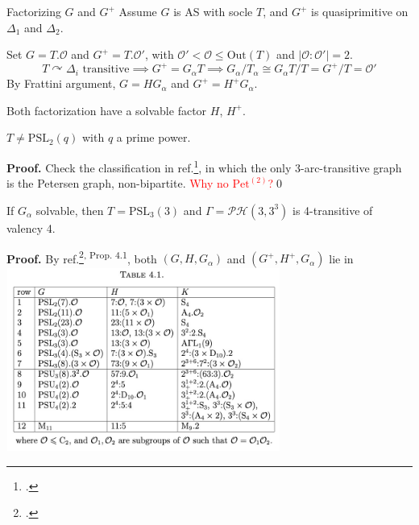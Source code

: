 \documentclass{beamer}
\def\PSL{\mathrm{PSL}}
\def\Out{\mathrm{Out}}
\def\PH{\mathcal{PH}}
\def\proof#1{\textbf{Proof.}{#1}\qed}
\begin{document}
\begin{frame}{Factorizing $G$ and $G^+$}
Assume $G$ is AS with socle $T$, and $G^+$ is quasiprimitive on $\Delta_1$ and $\Delta_2$.

Set $G=T.\mathcal{O}$ and $G^+=T.\mathcal{O}'$, with $\mathcal{O}'<\mathcal{O}\leq \Out(T)$ and $|\mathcal{O}:\mathcal{O}'|=2$.
\[ T\curvearrowright\Delta_i \text{ transitive} \implies G^+=G_\alpha T\implies G_\alpha/T_\alpha\cong G_\alpha T/ T=G^+/T=\mathcal{O'}\]
By Frattini argument, $G=HG_\alpha$ and $G^+=H^+G_\alpha$. 

Both factorization have a solvable factor $H$, $H^+$.

\begin{lemma}[5.1]
$T\neq \PSL_2(q)$ with $q$ a prime power.
\end{lemma}
\proof{ Check the classification in ref.\footcite{HASSANI1999twoarc}, in which the only 3-arc-transitive graph is the Petersen graph, non-bipartite. \qquad \textcolor{red}{Why no $\mathrm{Pet}^{(2)}$?}}
\end{frame}

\begin{frame}
\begin{lemma}[5.2]
If $G_\alpha$ solvable, then $T=\PSL_3(3)$ and $\Gamma=\PH(3,3^3)$ is 4-transitive of valency 4.
\end{lemma}
\textbf{Proof.} By ref.\footcite{LI2022factorizations}\textsuperscript{, Prop. 4.1}, both $(G,H,G_\alpha)$ and $(G^+,H^+,G_\alpha)$ lie in 
\center \includegraphics[width=9cm,height=6cm]{tab4.1.jpg}
\end{frame}
\end{document}
